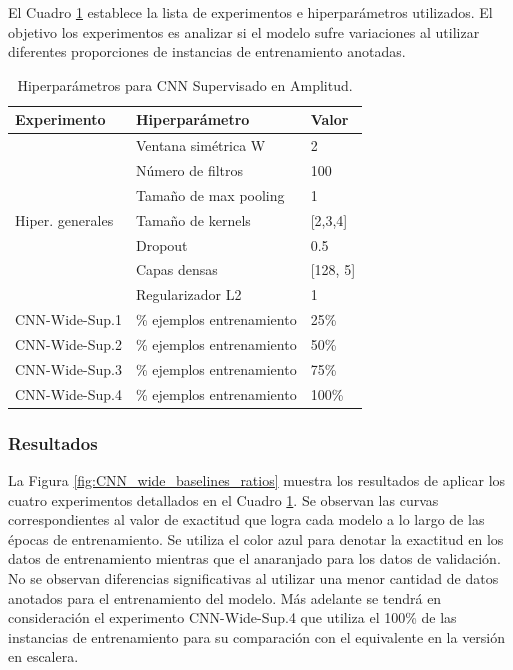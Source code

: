 El Cuadro \ref{tab:exp:cnn_wide_supervised} establece la lista de experimentos e hiperparámetros utilizados. 
El objetivo los experimentos es analizar si el modelo sufre variaciones al utilizar diferentes proporciones de
instancias de entrenamiento anotadas.

\begin{table}[h]
    \centering
    \begin{tabular}{|l|l|l|}
        \hline
        \textbf{Experimento} & \textbf{Hiperparámetro} & \textbf{Valor} \\
        \hline
        \multirow{7}{*}{Hiper. generales} & Ventana simétrica W & 2 \\
                              & Número de filtros & 100 \\
                              & Tamaño de max pooling & 1 \\
                              & Tamaño de kernels & [2,3,4] \\
                              & Dropout & 0.5 \\
                              & Capas densas & [128, 5] \\
                              & Regularizador L2 & 1 \\
        \hline
        \multirow{1}{*}{CNN-Wide-Sup.1} & \% ejemplos entrenamiento & 25\% \\
        \hline
        \multirow{1}{*}{CNN-Wide-Sup.2} & \% ejemplos entrenamiento & 50\% \\
        \hline
        \multirow{1}{*}{CNN-Wide-Sup.3} & \% ejemplos entrenamiento & 75\% \\
        \hline
        \multirow{1}{*}{CNN-Wide-Sup.4} & \% ejemplos entrenamiento & 100\% \\
        \hline
    \end{tabular}
    \caption{Hiperparámetros para CNN Supervisado en Amplitud.}
    \label{tab:exp:cnn_wide_supervised}
\end{table}

\subsubsection{Resultados}

La Figura \ref{fig:CNN_wide_baselines_ratios} muestra los resultados de aplicar los cuatro experimentos 
detallados en el Cuadro \ref{tab:exp:cnn_wide_supervised}. Se observan las curvas correspondientes al valor de
exactitud que logra cada modelo a lo largo de las épocas de entrenamiento. Se utiliza el color azul para 
denotar la exactitud en los datos de entrenamiento mientras que el anaranjado para los datos de validación. No
se observan diferencias significativas al utilizar una menor cantidad de datos anotados para el entrenamiento 
del modelo. Más adelante se tendrá en consideración el experimento CNN-Wide-Sup.4 que utiliza el 100\% de las 
instancias de entrenamiento para su comparación con el equivalente en la versión en escalera.

